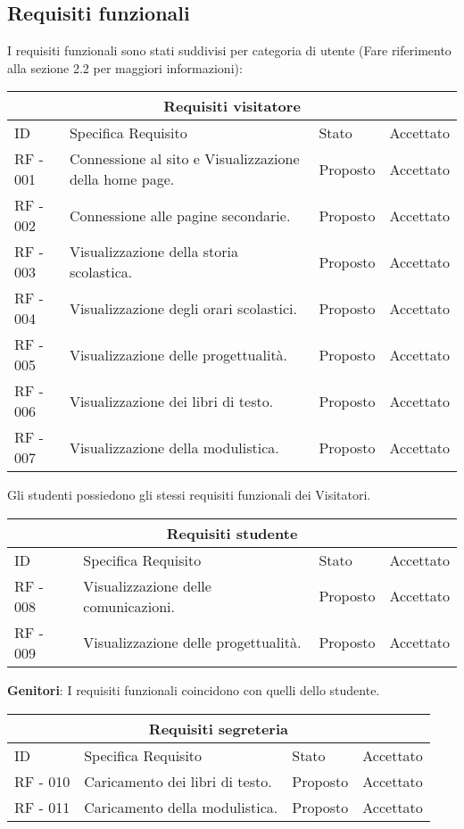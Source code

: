 \documentclass{article}
\begin{document}
\subsection{\textbf{Requisiti funzionali}}
\normalsize
\flushleft
I requisiti funzionali sono stati suddivisi per categoria di utente (Fare riferimento alla sezione 2.2 per maggiori informazioni):
	\begin{tabular}{ |p{1cm}|p{4cm}|p{3cm}|p{2cm}|  }
		\hline
		\multicolumn{4}{|c|}{Requisiti visitatore} \\
		\hline
		ID& Specifica Requisito &Stato&Accettato\\
		\hline
		RF - 001& Connessione al sito e Visualizzazione della home page. &Proposto&Accettato\\
		\hline
		RF - 002& Connessione alle pagine secondarie. &Proposto&Accettato\\
		\hline
		RF - 003& Visualizzazione della storia scolastica. &Proposto&Accettato\\
		\hline
		RF - 004& Visualizzazione degli orari scolastici. &Proposto&Accettato\\
		\hline
		RF - 005& Visualizzazione delle progettualità. &Proposto&Accettato\\
		\hline
		RF - 006& Visualizzazione dei libri di testo. &Proposto&Accettato\\
		\hline
		RF - 007& Visualizzazione della modulistica. &Proposto&Accettato\\
		\hline
	\end{tabular}
    Gli studenti possiedono gli stessi requisiti funzionali dei Visitatori.\\
	\begin{tabular}{ |p{1cm}|p{4cm}|p{3cm}|p{2cm}|  }
		\hline
		\multicolumn{4}{|c|}{Requisiti studente} \\
		\hline
		ID& Specifica Requisito &Stato&Accettato\\
		\hline
		RF - 008& Visualizzazione delle comunicazioni. &Proposto&Accettato\\
		\hline
		RF - 009& Visualizzazione delle progettualità. &Proposto&Accettato\\
		\hline
	\end{tabular}	
	\textbf{Genitori}: I requisiti funzionali coincidono con quelli dello studente.
	\begin{tabular}{ |p{1cm}|p{4cm}|p{3cm}|p{2cm}|  }
		\hline
		\multicolumn{4}{|c|}{Requisiti segreteria} \\
		\hline
		ID& Specifica Requisito &Stato&Accettato\\
		\hline
		RF - 010& Caricamento dei libri di testo. &Proposto&Accettato\\
		\hline
		RF - 011& Caricamento della modulistica. &Proposto&Accettato\\
		\hline
	\end{tabular}
\end{document}
